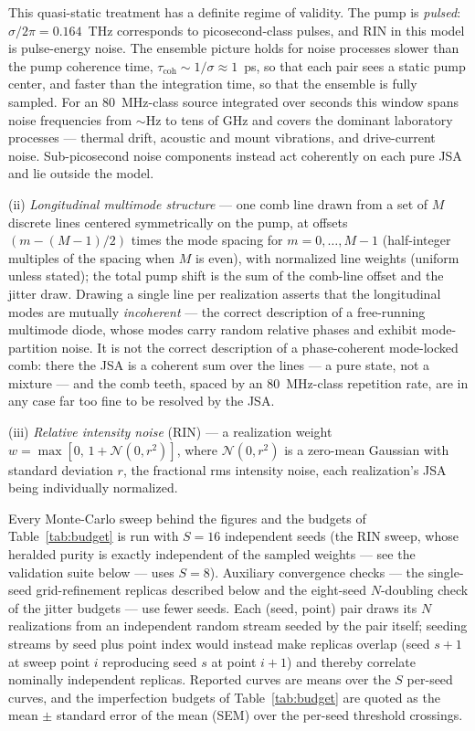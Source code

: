 This quasi-static treatment has a definite regime of validity. The
pump is \emph{pulsed}: $\sigma/2\pi = 0.164$~THz corresponds to
picosecond-class pulses, and RIN in this model is pulse-energy noise.
The ensemble picture holds for noise processes slower than the pump
coherence time, $\tau_{\mathrm{coh}} \sim 1/\sigma \approx 1$~ps, so
that each pair sees a static pump center, and faster than the
integration time, so that the ensemble is fully sampled. For an
80~MHz-class source integrated over seconds this window spans noise
frequencies from $\sim$Hz to tens of GHz and covers the dominant
laboratory processes --- thermal drift, acoustic and mount vibrations,
and drive-current noise. Sub-picosecond noise components instead act
coherently on each pure JSA and lie outside the model.

(ii) \emph{Longitudinal multimode structure} ---
one comb line drawn from a set of $M$ discrete lines centered
symmetrically on the pump, at offsets $(m - (M-1)/2)$ times the mode
spacing for $m = 0,\dots,M-1$ (half-integer multiples of the spacing
when $M$ is even), with normalized line weights (uniform unless
stated); the total pump shift is the sum of
the comb-line offset and the jitter draw. Drawing a single line per
realization asserts that the longitudinal modes are mutually
\emph{incoherent} --- the correct description of a free-running
multimode diode, whose modes carry random relative phases and exhibit
mode-partition noise. It is not the correct description of a
phase-coherent mode-locked comb: there the JSA is a coherent sum over
the lines --- a pure state, not a mixture --- and the comb teeth,
spaced by an 80~MHz-class repetition rate, are in any case far too
fine to be resolved by the JSA.

(iii) \emph{Relative
intensity noise} (RIN) --- a realization weight
$w = \max[0,\, 1 + \mathcal{N}(0, r^2)]$, where $\mathcal{N}(0, r^2)$
is a zero-mean Gaussian with standard deviation $r$, the fractional rms
intensity noise, each realization's JSA being individually normalized.

Every Monte-Carlo sweep behind the figures and the budgets of
Table~\ref{tab:budget} is run with $S = 16$ independent seeds (the
RIN sweep, whose heralded purity is exactly independent of the sampled
weights --- see the validation suite below --- uses $S = 8$).
Auxiliary convergence checks --- the single-seed grid-refinement
replicas described below and the eight-seed $N$-doubling check of the
jitter budgets --- use fewer seeds. Each
(seed, point) pair draws its $N$ realizations from an independent
random stream seeded by the pair itself; seeding streams by seed plus
point index would instead make replicas overlap (seed $s+1$ at sweep
point $i$ reproducing seed $s$ at point $i+1$) and thereby correlate
nominally independent replicas. Reported curves are means over the $S$
per-seed curves, and the imperfection budgets of
Table~\ref{tab:budget} are quoted as the mean $\pm$ standard error of
the mean (SEM) over the per-seed threshold crossings.

